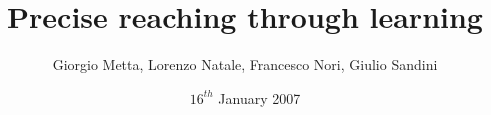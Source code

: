 \title {Precise reaching through learning}
\author{Giorgio Metta, Lorenzo Natale, Francesco Nori, Giulio Sandini}
\date{$16^{th}$ January 2007}
\maketitle